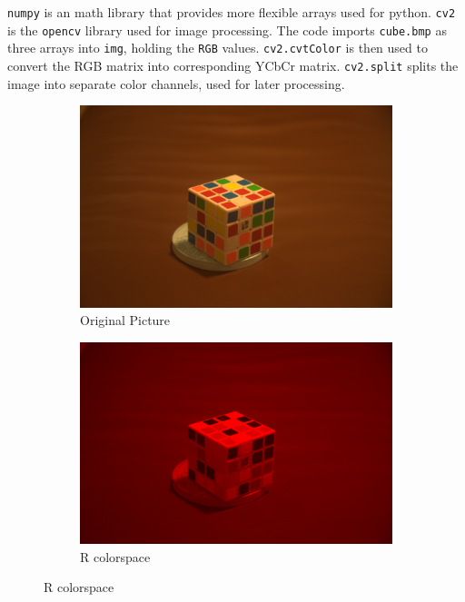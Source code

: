 \documentclass{article}
\begin{document}
\texttt{numpy} is an math library that provides more flexible arrays used for python.
\texttt{cv2} is the \texttt{opencv} library used for image processing.
The code imports \texttt{cube.bmp} as three arrays into \texttt{img}, holding the \texttt{RGB} values.
\texttt{cv2.cvtColor} is then used to convert the RGB matrix into corresponding YCbCr matrix.
\texttt{cv2.split} splits the image into separate color channels, used for later processing.

\begin{figure}[h]
\centering
\begin{subfigure}[b]{0.4\textwidth}
\caption{Original Picture}
\begin{center}
	\includegraphics[width=\textwidth]{./implementation/experiment/out.png}
\end{center}
\end{subfigure}
\begin{subfigure}[b]{0.4\textwidth}
\caption{R colorspace}
\begin{center}
	\includegraphics[width=\textwidth]{./implementation/experiment/red.png}

\end{center}
\end{subfigure}
\end{figure}
\end{document}
